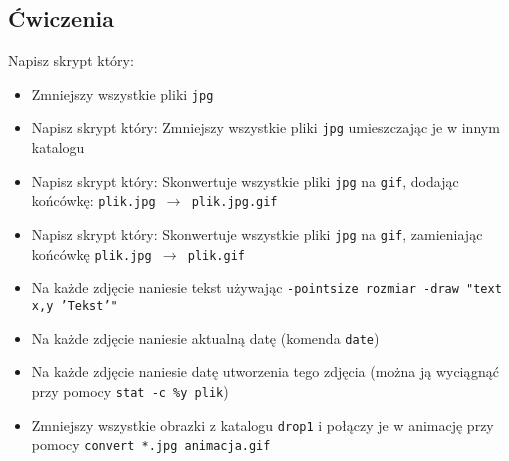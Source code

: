 \documentclass{instrukcja}
\begin{document}
\subsection*{Ćwiczenia}
Napisz skrypt który:
\begin{itemize}

\item Zmniejszy wszystkie pliki {\tt jpg}
\item Napisz skrypt który: Zmniejszy wszystkie pliki {\tt jpg} umieszczając je w innym katalogu
\item Napisz skrypt który: Skonwertuje wszystkie pliki {\tt jpg} na {\tt gif}, dodając końcówkę: {\tt plik.jpg $\rightarrow$ plik.jpg.gif}
\item Napisz skrypt który: Skonwertuje wszystkie pliki {\tt jpg} na {\tt gif}, zamieniając końcówkę {\tt plik.jpg $\rightarrow$ plik.gif}
\item Na każde zdjęcie naniesie tekst używając {\tt -pointsize {\green rozmiar} -draw "{}text {\green x},{\green y} '{\green Tekst}'"{}}
\item Na każde zdjęcie naniesie aktualną datę (komenda {\tt date})
\item Na każde zdjęcie naniesie datę utworzenia tego zdjęcia (można ją wyciągnąć przy pomocy {\tt stat -c \%y plik})
\item Zmniejszy wszystkie obrazki z katalogu {\tt drop1} i połączy je w animację przy pomocy {\tt convert *.jpg animacja.gif}
\end{itemize}
\end{document}
